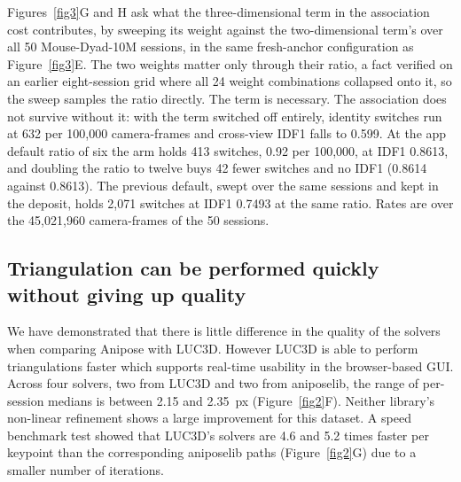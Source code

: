 \documentclass[pdflatex, sn-nature]{sn-jnl}
\theoremstyle{thmstyleone}%
\theoremstyle{thmstyletwo}%
\theoremstyle{thmstylethree}%
\begin{document}
Figures~\ref{fig3}G and H ask what the three-dimensional term in the association cost contributes, by sweeping its weight against the two-dimensional term's over all 50 Mouse-Dyad-10M sessions, in the same fresh-anchor configuration as Figure~\ref{fig3}E. The two weights matter only through their ratio, a fact verified on an earlier eight-session grid where all 24 weight combinations collapsed onto it, so the sweep samples the ratio directly. The term is necessary. The association does not survive without it: with the term switched off entirely, identity switches run at 632 per 100,000 camera-frames and cross-view IDF1 falls to 0.599. At the app default ratio of six the arm holds 413 switches, 0.92 per 100,000, at IDF1 0.8613, and doubling the ratio to twelve buys 42 fewer switches and no IDF1 (0.8614 against 0.8613). The previous default, swept over the same sessions and kept in the deposit, holds 2,071 switches at IDF1 0.7493 at the same ratio. Rates are over the 45,021,960 camera-frames of the 50 sessions.

\subsection{Triangulation can be performed quickly without giving up quality}\label{subsec2-4}

We have demonstrated that there is little difference in the quality of the solvers when comparing Anipose with LUC3D. However LUC3D is able to perform triangulations faster which supports real-time usability in the browser-based GUI. Across four solvers, two from LUC3D and two from aniposelib, the range of per-session medians is between 2.15 and 2.35~px (Figure~\ref{fig2}F). Neither library's non-linear refinement shows a large improvement for this dataset. A speed benchmark test showed that LUC3D's solvers are 4.6 and 5.2 times faster per keypoint than the corresponding aniposelib paths (Figure~\ref{fig2}G) due to a smaller number of iterations.
\end{document}
